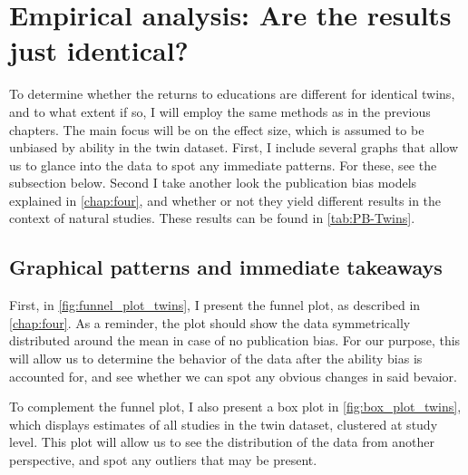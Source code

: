 \begin{table}[!htbp]
\begin{tabular}
        \bottomrule
    \end{tabular}
\end{table}

\section{Empirical analysis: Are the results just identical?}
\label{sec:twins_analysis}

To determine whether the returns to educations are different for identical twins, and to what extent if so, I will employ the same methods as in the previous chapters. The main focus will be on the effect size, which is assumed to be unbiased by ability in the twin dataset. First, I include several graphs that allow us to glance into the data to spot any immediate patterns. For these, see the subsection below. Second I take another look the publication bias models explained in \autoref{chap:four}, and whether or not they yield different results in the context of natural studies. These results can be found in \autoref{tab:PB-Twins}.

\subsection*{Graphical patterns and immediate takeaways}

First, in \autoref{fig:funnel_plot_twins}, I present the funnel plot, as described in \autoref{chap:four}. As a reminder, the plot should show the data symmetrically distributed around the mean in case of no publication bias. For our purpose, this will allow us to determine the behavior of the data after the ability bias is accounted for, and see whether we can spot any obvious changes in said bevaior.

To complement the funnel plot, I also present a box plot in \autoref{fig:box_plot_twins}, which displays estimates of all studies in the twin dataset, clustered at study level. This plot will allow us to see the distribution of the data from another perspective, and spot any outliers that may be present.


